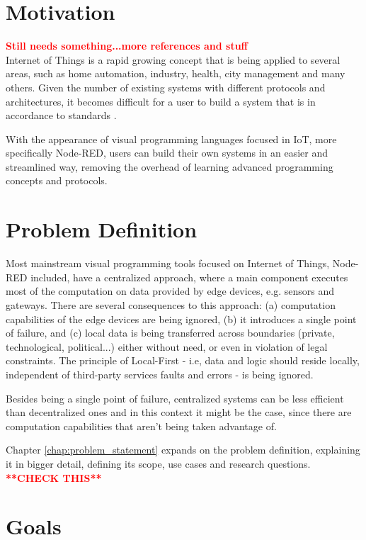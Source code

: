 \section{Motivation} \label{sec:motivation}

\textcolor{red}{\textbf{Still needs something...more references and stuff}}\\
Internet of Things is a rapid growing concept that is being applied to several areas, such as home automation, industry, health, city management and many others. Given the number of existing systems with different protocols and architectures, it becomes difficult for a user to build a system that is in accordance to standards \cite{standard-iot}. 
\par With the appearance of visual programming languages focused in IoT, more specifically Node-RED, users can build their own systems in an easier and streamlined way, removing the overhead of learning advanced programming concepts and protocols.   

\section{Problem Definition} \label{sec:problem_definition}

Most mainstream visual programming tools focused on Internet of Things, Node-RED included, have a centralized approach, where a main component executes most of the computation on data provided by edge devices, e.g. sensors and gateways. There are several consequences to this approach: (a) computation capabilities of the edge devices are being ignored, (b) it introduces a single point of failure, and (c) local data is being transferred across boundaries (private, technological, political...) either without need, or even in violation of legal constraints. The principle of Local-First - i.e, data and logic should reside locally, independent of third-party services faults and errors - is being ignored. 
\par Besides being a single point of failure, centralized systems can be less efficient than decentralized ones and in this context it might be the case, since there are computation capabilities that aren't being taken advantage of.
\par Chapter \ref{chap:problem_statement} expands on the problem definition, explaining it in bigger detail, defining its scope, use cases and research questions. \textcolor{red}{\textbf{**CHECK THIS**}}

\section{Goals} \label{sec:goals}

